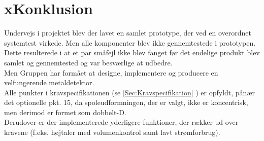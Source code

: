 \documentclass[../main.tex]{subfiles}
\begin{document}
\chapter{xKonklusion} \label{Chap:xKonklusion}
Undervejs i projektet blev der lavet en samlet prototype, der ved en overordnet systemtest virkede. Men alle komponenter blev ikke gennemtestede i prototypen. Dette resulterede i at et par småfejl ikke blev fanget før det endelige produkt blev samlet og gennemtested og var besværlige at udbedre.\\
Men Gruppen har formået at designe, implementere og producere en velfungerende metaldetektor.\\
Alle punkter i kravspecifikationen (se \ref{Sec:Kravspecifikation} ) er opfyldt, pånær det optionelle pkt. 15, da spoleudformningen, der er valgt, ikke er koncentrisk, men derimod er formet som dobbelt-D.\\
Derudover er der implementerede yderligere funktioner, der rækker ud over kravene (f.eks. højtaler med volumenkontrol samt  lavt strømforbrug).
\end{document}
